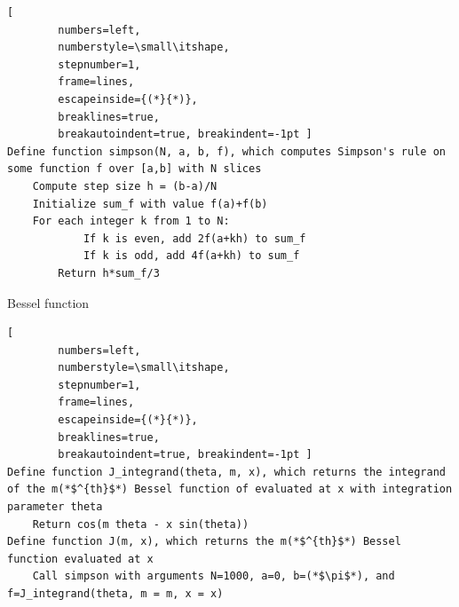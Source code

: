 \documentclass{article}
\newcommand{\code}{\texttt}
\begin{document}
\begin{enumerate}
\begin{enumerate}
    \begin{lstlisting}[
        numbers=left,
        numberstyle=\small\itshape,
        stepnumber=1,
        frame=lines,
        escapeinside={(*}{*)},
        breaklines=true,
        breakautoindent=true, breakindent=-1pt ] 
Define function simpson(N, a, b, f), which computes Simpson's rule on some function f over [a,b] with N slices
    Compute step size h = (b-a)/N
    Initialize sum_f with value f(a)+f(b)
    For each integer k from 1 to N:
            If k is even, add 2f(a+kh) to sum_f
            If k is odd, add 4f(a+kh) to sum_f
        Return h*sum_f/3
    \end{lstlisting}
\newpage
    Bessel function
    \begin{lstlisting}[
        numbers=left,
        numberstyle=\small\itshape,
        stepnumber=1,
        frame=lines,
        escapeinside={(*}{*)},
        breaklines=true,
        breakautoindent=true, breakindent=-1pt ] 
Define function J_integrand(theta, m, x), which returns the integrand of the m(*$^{th}$*) Bessel function of evaluated at x with integration parameter theta
    Return cos(m theta - x sin(theta))
Define function J(m, x), which returns the m(*$^{th}$*) Bessel function evaluated at x 
    Call simpson with arguments N=1000, a=0, b=(*$\pi$*), and                 f=J_integrand(theta, m = m, x = x)
    \end{lstlisting}


\end{enumerate}
\end{enumerate}
\end{document}
